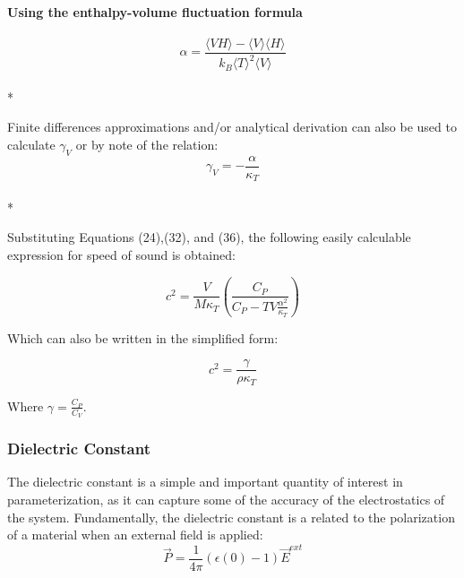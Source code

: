 \documentclass[aps,pre,twocolumn,nofootinbib,superscriptaddress,linenumbers,10pt, draft,tightenlines]{revtex4-1}
\begin{document}
\paragraph{Using the enthalpy-volume fluctuation formula}
\begin{equation}\alpha = \frac{\langle VH \rangle - \langle V \rangle \langle H \rangle}{k_B \langle T \rangle^2 \langle V \rangle}\end{equation}\\*

Finite differences approximations and/or analytical derivation can also be used to calculate $\gamma_V$ or by note of the relation:
\begin{equation}\gamma_V = - \frac{\alpha}{\kappa_T}\end{equation}\\*

Substituting Equations (24),(32), and (36), the following easily calculable expression for speed of sound is obtained:

\begin{equation} c^2=\frac{V}{M \kappa_T}\left(\frac{C_P}{C_P -TV\frac{\alpha^2}{\kappa_T}}\right)\end{equation}

Which can also be written in the simplified form:

\begin{equation} c^2= \frac{\gamma}{\rho \kappa_T} \end{equation}

Where $ \gamma=\frac{C_P}{C_V} $.


\subsubsection{Dielectric Constant}

The dielectric constant is a simple and important quantity of interest in parameterization, as it can capture some of the accuracy of the electrostatics of the system.  Fundamentally, the dielectric constant is a related to the polarization of a material when an external field is applied: \cite{riniker_calculation_2011}
\begin{equation} \vec{P} = \frac{1}{4\pi}(\epsilon(0)-1)\vec{E}^{ext} \end{equation}
\end{document}
